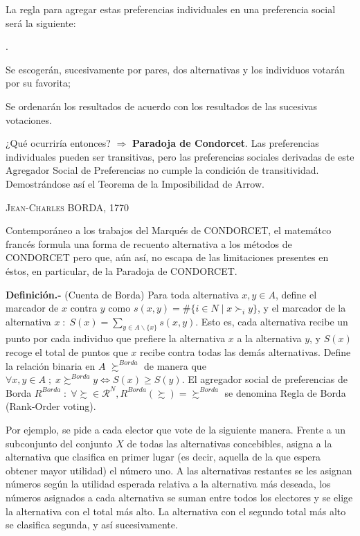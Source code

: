 \documentclass[10pt,a4paper]{article}
\newcounter{numitem}
\newenvironment{lnum}
      {\begin{list}{\arabic{numitem}.}{%
          \usecounter{numitem}%
          \setlength{\leftmargin}{1cm}%
          \setlength{\parskip}{3pt}%
          \setlength{\itemsep}{0pt}%
          \setlength{\parsep}{0pt}%
      }}
      {\end{list}}
\begin{document}
La regla para agregar estas preferencias individuales en una preferencia social será la siguiente: 
\begin{lnum}
    \item Se escogerán, sucesivamente por pares, dos alternativas y los individuos votarán por su favorita;
    \item Se ordenarán los resultados de acuerdo con los resultados de las sucesivas votaciones. 
\end{lnum}

¿Qué ocurriría entonces? $\Longrightarrow$ \textbf{Paradoja de Condorcet}. Las preferencias individuales pueden ser transitivas, pero las preferencias sociales derivadas de este Agregador Social de Preferencias no cumple la condición de transitividad. Demostrándose así el Teorema de la Imposibilidad de Arrow.

\textsc{Jean-Charles BORDA, 1770}

Contemporáneo a los trabajos del Marqués de CONDORCET, el matemátco francés formula una forma de recuento alternativa a los métodos de CONDORCET pero que, aún así, no escapa de las limitaciones presentes en éstos, en particular, de la Paradoja de CONDORCET.

\textbf{Definición.-} (Cuenta de Borda) Para toda alternativa $x,y\in A$, define el marcador de $x $ contra $y$ como $s(x, y) = \#\{ i\in N \;|\;x \succ_i y\}$, y el marcador de la alternativa $x\;:\; S(x) = \sum_{y\in A\backslash \{x\}} s(x,y)$. Esto es, cada alternativa recibe un punto por cada individuo que prefiere la alternativa $x$ a la alternativa $y$, y $S(x)$ recoge el total de puntos que $x$ recibe contra todas las demás alternativas. Define la relación binaria en $A$ $\succsim^{Borda}$ de manera que $\forall x,y \in A \; ; \; x\succsim^{Borda}y \iff S(x)\ge S(y)$. El agregador social de preferencias de Borda $R^{Borda} \; :\; \forall \succsim\in \mathcal{R}^N, R^{Borda}(\succsim)=\succsim^{Borda}$  se denomina Regla de Borda (Rank-Order voting).

Por ejemplo, se pide a cada elector que vote de la siguiente manera. Frente a un subconjunto del conjunto $X$ de todas las alternativas concebibles, asigna a la alternativa que clasifica en primer lugar (es decir, aquella de la que espera obtener mayor utilidad) el número uno. A las alternativas restantes se les asignan números según la utilidad esperada relativa a la alternativa más deseada, los números asignados a cada alternativa se suman entre todos los electores y se elige la alternativa con el total más alto. La alternativa con el segundo total más alto se clasifica segunda, y así sucesivamente.
\end{document}
